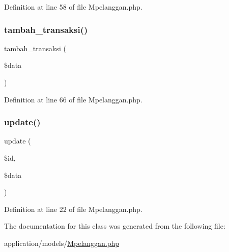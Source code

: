 Definition at line 58 of file Mpelanggan.\+php.

\mbox{\label{class_mpelanggan_a714bedce1322d287bcfb93295feddb9c}} 
\subsubsection{\texorpdfstring{tambah\_transaksi()}{tambah\_transaksi()}}
{\footnotesize\ttfamily tambah\+\_\+transaksi (\begin{DoxyParamCaption}\item[{}]{\$data }\end{DoxyParamCaption})}



Definition at line 66 of file Mpelanggan.\+php.

\mbox{\label{class_mpelanggan_acaa59d49766017d95ff8c84597aa88b8}} 
\subsubsection{\texorpdfstring{update()}{update()}}
{\footnotesize\ttfamily update (\begin{DoxyParamCaption}\item[{}]{\$id,  }\item[{}]{\$data }\end{DoxyParamCaption})}



Definition at line 22 of file Mpelanggan.\+php.



The documentation for this class was generated from the following file\+:\begin{DoxyCompactItemize}
\item 
application/models/\mbox{\hyperlink{_mpelanggan_8php}{Mpelanggan.\+php}}\end{DoxyCompactItemize}
